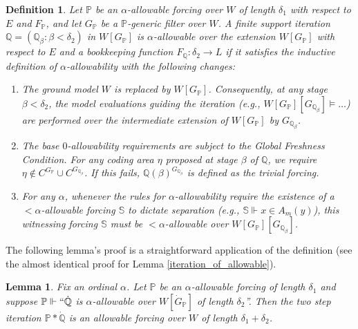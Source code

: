\documentclass[a4paper,11pt]{article}
\newtheorem{lemma}[theorem]{Lemma}
\newtheorem{definition}[theorem]{Definition}
\newcommand{\forceP}{\mathbb{P}}
\newcommand{\forceQ}{\mathbb{Q}}
\begin{document}
\begin{definition}\label{def:alpha_allowable_extension}
Let $\mathbb{P}$ be an $\alpha$-allowable forcing over $W$ of length $\delta_1$ with respect to $E$ and $F_{\mathbb{P}}$, and let $G_{\mathbb{P}}$ be a $\mathbb{P}$-generic filter over $W$. A finite support iteration $\mathbb{Q} = (\mathbb{Q}_{\beta} : \beta < \delta_2)$ in $W[G_{\mathbb{P}}]$ is \emph{$\alpha$-allowable over the extension $W[G_{\mathbb{P}}]$} with respect to $E$ and a bookkeeping function $F_{\mathbb{Q}} : \delta_2 \to L$ if it satisfies the inductive definition of $\alpha$-allowability with the following changes:

\begin{enumerate}
    \item The ground model $W$ is replaced by $W[G_{\mathbb{P}}]$. Consequently, at any stage $\beta < \delta_2$, the model evaluations guiding the iteration (e.g., $W[G_{\mathbb{P}}][G_{\mathbb{Q}_\beta}] \models \dots$) are performed over the intermediate extension of $W[G_{\mathbb{P}}]$ by $G_{\mathbb{Q}_\beta}$.
    \item The base $0$-allowability requirements are subject to the Global Freshness Condition. For any coding area $\eta$ proposed at stage $\beta$ of $\mathbb{Q}$, we require $\eta \notin C^{G_{\mathbb{P}}} \cup C^{G_{\mathbb{Q}_\beta}}$. If this fails, $\mathbb{Q}(\beta)^{G_{\mathbb{Q}_\beta}}$ is defined as the trivial forcing.
    \item  For any $\alpha$, whenever the rules for $\alpha$-allowability require the existence of a $<\alpha$-allowable forcing $\mathbb{S}$ to dictate separation (e.g., $\mathbb{S} \Vdash x \in A_m(y)$), this witnessing forcing $\mathbb{S}$ must be $<\alpha$-allowable \emph{over} $W[G_{\mathbb{P}}][G_{\mathbb{Q}_\beta}]$.
\end{enumerate}
\end{definition}

The following lemma's proof is a straightforward application of the definition (see the almost identical proof for Lemma \ref{iteration_of_allowable}).
\begin{lemma}
   Fix an ordinal $\alpha$. Let $\forceP$ be an $\alpha$-allowable forcing of length $\delta_1$ and suppose $\forceP \Vdash ``\dot{\forceQ}$ is $\alpha$-allowable over $W[\dot{G}_{\forceP}]$ of length $\delta_2$''. Then the two step iteration $\forceP \ast \dot{\forceQ}$ is an allowable forcing over $W$ of length $\delta_1 + \delta_2$.
\end{lemma}
\end{document}
